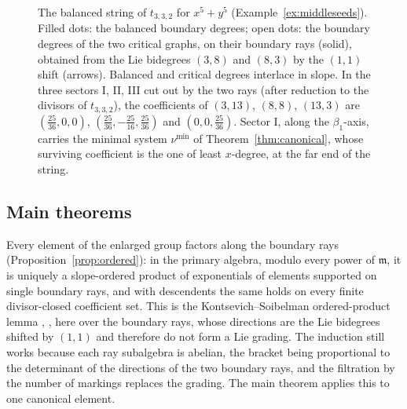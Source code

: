 \documentclass[11pt]{amsart}
\theoremstyle{definition}
\theoremstyle{remark}
\begin{document}
\begin{figure}[t]
\centering
{}
\caption{The balanced string of $t_{3,3,2}$ for $x^5+y^5$
(Example~\ref{ex:middleseeds}).  Filled dots: the balanced boundary degrees;
open dots: the boundary degrees of the two critical graphs, on their boundary
rays (solid), obtained from the Lie bidegrees $(3,8)$ and $(8,3)$ by the
$(1,1)$ shift (arrows).  Balanced and critical degrees interlace in slope.  In
the three sectors I, II, III cut out by the two rays (after reduction to the
divisors of $t_{3,3,2}$), the coefficients of $(3,13)$, $(8,8)$, $(13,3)$ are
$(\tfrac{25}{36},0,0)$, $(\tfrac{25}{36},-\tfrac{25}{16},\tfrac{25}{36})$ and
$(0,0,\tfrac{25}{36})$.  Sector I, along the $\beta_1$-axis, carries the
minimal system $\nu^{\min}$ of Theorem~\ref{thm:canonical}, whose surviving
coefficient is the one of least $x$-degree, at the far end of the string.}
\label{fig:string}
\end{figure}

\subsection*{Main theorems}
Every element of the enlarged group factors along the boundary rays
(Proposition~\ref{prop:ordered}): in the primary algebra, modulo every power
of $\mathfrak m$, it is uniquely a slope-ordered product of exponentials of
elements supported on single boundary rays, and with descendents the same
holds on every finite divisor-closed coefficient set.  This is the
Kontsevich--Soibelman ordered-product lemma \cite{KS06}, \cite[\S0.3 and
Thm.~1.4]{GPS10}, here over the boundary rays, whose directions are the Lie
bidegrees shifted by $(1,1)$ and therefore do not form a Lie grading.  The
induction still works because each ray subalgebra is abelian, the bracket
being proportional to the determinant of the directions of the two boundary
rays, and the filtration by the number of markings replaces the grading.  The
main theorem applies this to one canonical element.
\end{document}
